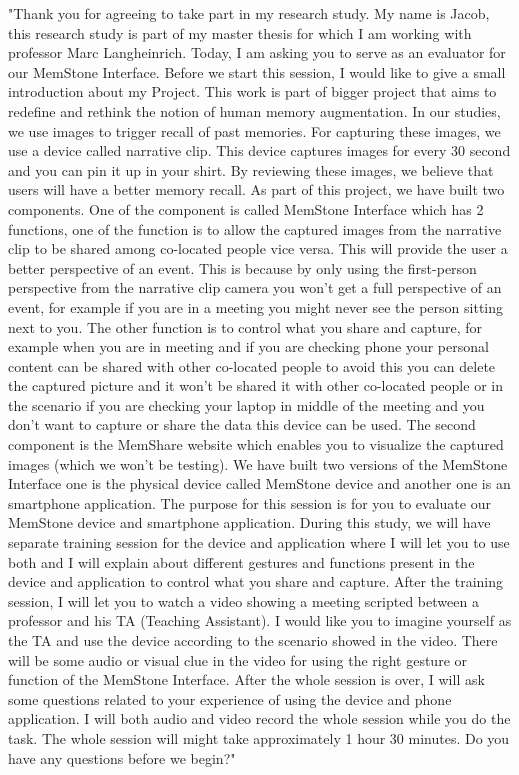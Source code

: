 \documentclass[mscthesis]{usiinfthesis}
\begin{document}
"Thank you for agreeing to take part in my research study. My name is Jacob, this research study is part of my master thesis for which I am working with professor Marc Langheinrich. 
Today, I am asking you to serve as an evaluator for our MemStone Interface.
Before we start this session, I would like to give a small introduction about my Project. This work is part of bigger project that aims to redefine and rethink the notion of human memory augmentation. In our studies, we use images to trigger recall of past memories. For capturing these images, we use a device called narrative clip. This device captures images for every 30 second and you can pin it up in your shirt. By reviewing these images, we believe that users will have a better memory recall. As part of this project, we have built two components. One of the component is called MemStone Interface which has 2 functions, one of the function is to allow the captured images from the narrative clip to be shared among co-located people vice versa. This will provide the user a better perspective of an event. This is because by only using the first-person perspective from the narrative clip camera you won't get a full perspective of an event, for example if you are in a meeting you might never see the person sitting next to you. The other function is to control what you share and capture, for example when you are in meeting and if you are checking phone your personal content can be shared with other co-located people to avoid this you can delete the captured picture and it won't be shared it with other co-located people or in the scenario if you are checking your laptop in middle of the meeting and you don't want to capture or share the data this device can be used. The second component is the MemShare website which enables you to visualize the captured images (which we won't be testing). We have built two versions of the MemStone Interface one is the physical device called MemStone device and another one is an smartphone application. The purpose for this session is for you to evaluate our MemStone device and smartphone application. During this study, we will have separate training session for the device and application where I will let you to use both and I will explain about different gestures and functions present in the device and application to control what you share and capture.
After the training session, I will let you to watch a video showing a meeting scripted between a professor and his TA (Teaching Assistant). I would like you to imagine yourself as the TA and use the device according to the scenario showed in the video. There will be some audio or visual clue in the video for using the right gesture or function of the MemStone Interface. After the whole session is over, I will ask some questions related to your experience of using the device and phone application. I will both audio and video record the whole session while you do the task. The whole session will might take approximately 1 hour 30 minutes. Do you have any questions before we begin?"
\end{document}
